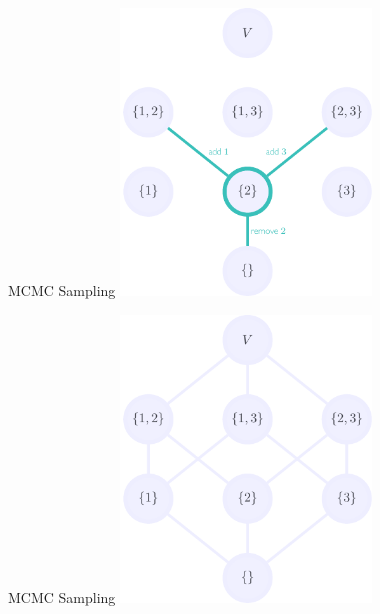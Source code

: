 \documentclass[mathserif]{beamer}
\begin{document}
\begin{frame}{MCMC Sampling}
\vspace{0.5em}
\centering
\includegraphics[height=3in]{figures/lattice_example_edges.pdf}
\end{frame}

\begin{frame}{MCMC Sampling}
\vspace{0.5em}
\centering
\includegraphics[height=3in]{figures/lattice_full.pdf}
\end{frame}

\end{document}
